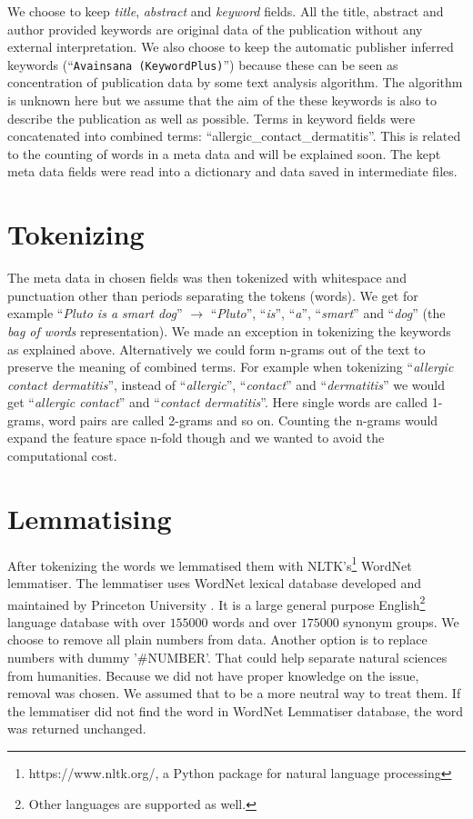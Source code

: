 We choose to keep \emph{title}, \emph{abstract} and 
\emph{keyword} fields. All the title, abstract and author 
provided keywords are original data of the publication without 
any external interpretation. We also choose to keep the automatic 
publisher inferred keywords (``\texttt{Avainsana 
(KeywordPlus)}'') because these can be seen as concentration of 
publication data by some text analysis algorithm. The algorithm is 
unknown here but we assume that the aim of the these keywords is 
also to describe the publication as well as possible. 
Terms in keyword fields were concatenated into combined terms: 
``allergic\_contact\_dermatitis''. This is related to the counting 
of words in a meta data and will be explained soon. The kept 
meta data fields were read into a dictionary and data saved in 
intermediate files.

\section{Tokenizing}
The meta data in chosen fields was then tokenized with whitespace 
and punctuation other than periods separating the tokens (words). 
We get for example ``\emph{Pluto is a smart dog}'' $\rightarrow$ 
``\emph{Pluto}'', ``\emph{is}'', ``\emph{a}'', ``\emph{smart}'' 
and ``\emph{dog}'' (the \emph{bag of words} representation).
We made an exception in tokenizing the keywords as explained above.
Alternatively we could form n-grams out of the text to preserve 
the meaning of combined terms. For example when tokenizing 
``\emph{allergic contact dermatitis}'', instead of 
``\emph{allergic}'', ``\emph{contact}'' and 
``\emph{dermatitis}'' we would get ``\emph{allergic contact}'' 
and ``\emph{contact dermatitis}''. Here single words are called 
1-grams, word pairs are called 2-grams and so on. Counting the 
n-grams would expand the feature space n-fold though and we wanted 
to avoid the computational cost. 

\section{Lemmatising}
After tokenizing the words we lemmatised them with 
NLTK's\footnote{https://www.nltk.org/, a Python package for natural language processing}
WordNet lemmatiser. The lemmatiser uses WordNet lexical database 
developed and maintained by Princeton University 
\cite{noauthor_princeton_2010}. It is a large general purpose 
English\footnote{Other languages are supported as well.} language 
database with over $155000$ words and over $175000$ synonym 
groups.
We choose to remove all plain numbers from
data. Another option is to replace numbers with dummy '\#NUMBER'.
That could help separate natural sciences from humanities. Because 
we did not have proper knowledge on the issue, removal was chosen. 
We assumed that to be a more neutral way to treat them. 
If the lemmatiser did not find the word in WordNet Lemmatiser 
database, the word was returned unchanged. 

